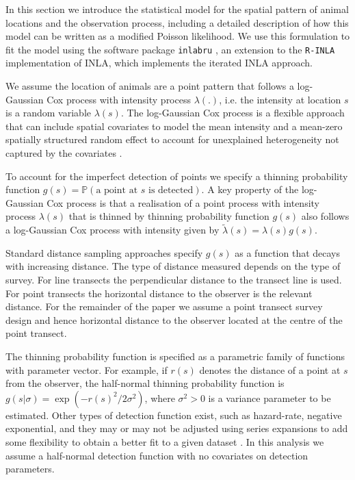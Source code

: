 \documentclass[preprint,12pt]{elsarticle}
\newcommand{\tl}{\tilde{\lambda}}   %
\begin{document}
In this section we introduce the statistical model for the spatial pattern of animal locations and the observation process, including a detailed description of how this model can be written as a modified Poisson likelihood.  We use this formulation to fit the model using the software package \texttt{inlabru} \citep{bachl_inlabru_2019}, an extension to the \texttt{R-INLA} implementation of INLA, which implements the iterated INLA approach.

We assume the location of animals are a point pattern that follows a log-Gaussian Cox process with intensity process $\lambda(.)$, i.e.  the intensity at location $s$ is a random variable $\lambda(s)$.  The log-Gaussian Cox process is a flexible approach that can include spatial covariates to model the mean intensity and a mean-zero spatially structured random effect to account for unexplained heterogeneity not captured by the covariates \citep{moller_log_1998}.

To account for the imperfect detection of points we specify a thinning probability function $g(s) = \mathbb{P}(\text{a point at $s$ is detected})$. A key property of the log-Gaussian Cox process is that a realisation of a point process with intensity process $\lambda(s)$ that is thinned by thinning probability function $g(s)$ also follows a log-Gaussian Cox process with intensity given by $\tl(s) = \lambda(s)g(s)$.

Standard distance sampling approaches specify $g(s)$ as a function that decays with increasing distance.  The type of distance measured depends on the type of survey.  For line transects the perpendicular distance to the transect line is used.  For point transects the horizontal distance to the observer is the relevant distance.  For the remainder of the paper we assume a point transect survey design and hence horizontal distance to the observer located at the centre of the point transect.  

The thinning probability function is specified as a parametric family of functions with parameter vector.  For example, if $r(s)$ denotes the distance of a point at $s$ from the observer, the half-normal thinning probability function is $g(s | \sigma) = \exp(-r(s)^2 / 2\sigma^2)$, where $\sigma^2 > 0$ is a variance parameter to be estimated.  Other types of detection function exist, such as hazard-rate, negative exponential, and they may or may not be adjusted using series expansions to add some flexibility to obtain a better fit to a given dataset \citep{buckland_distance_2015}.  In this analysis we assume a half-normal detection function with no covariates on detection parameters.
\end{document}
